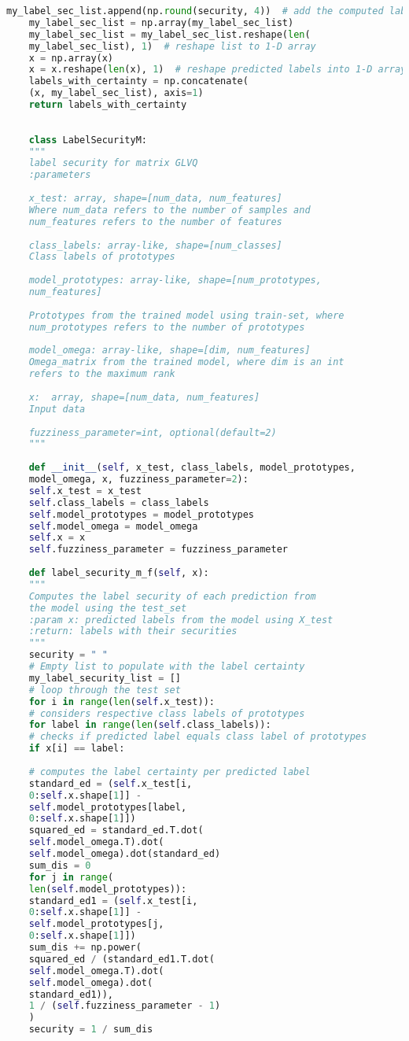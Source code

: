 \begin{lstlisting}[caption=label\textunderscore security1.py ,style=chstyle, language=Python]
	my_label_sec_list.append(np.round(security, 4))  # add the computed label certainty to list above
	my_label_sec_list = np.array(my_label_sec_list)
	my_label_sec_list = my_label_sec_list.reshape(len(
	my_label_sec_list), 1)  # reshape list to 1-D array
	x = np.array(x)
	x = x.reshape(len(x), 1)  # reshape predicted labels into 1-D array
	labels_with_certainty = np.concatenate(
	(x, my_label_sec_list), axis=1)
	return labels_with_certainty
	
	
	class LabelSecurityM:
	"""
	label security for matrix GLVQ
	:parameters
	
	x_test: array, shape=[num_data, num_features]
	Where num_data refers to the number of samples and
	num_features refers to the number of features
	
	class_labels: array-like, shape=[num_classes]
	Class labels of prototypes
	
	model_prototypes: array-like, shape=[num_prototypes,
	num_features]
	
	Prototypes from the trained model using train-set, where
	num_prototypes refers to the number of prototypes
	
	model_omega: array-like, shape=[dim, num_features]
	Omega_matrix from the trained model, where dim is an int
	refers to the maximum rank
	
	x:  array, shape=[num_data, num_features]
	Input data
	
	fuzziness_parameter=int, optional(default=2)
	"""
	
	def __init__(self, x_test, class_labels, model_prototypes,
	model_omega, x, fuzziness_parameter=2):
	self.x_test = x_test
	self.class_labels = class_labels
	self.model_prototypes = model_prototypes
	self.model_omega = model_omega
	self.x = x
	self.fuzziness_parameter = fuzziness_parameter
	
	def label_security_m_f(self, x):
	"""
	Computes the label security of each prediction from 
	the model using the test_set
	:param x: predicted labels from the model using X_test
	:return: labels with their securities
	"""
	security = " "
	# Empty list to populate with the label certainty
	my_label_security_list = []
	# loop through the test set
	for i in range(len(self.x_test)):
	# considers respective class labels of prototypes
	for label in range(len(self.class_labels)):
	# checks if predicted label equals class label of prototypes
	if x[i] == label:
	
	# computes the label certainty per predicted label
	standard_ed = (self.x_test[i,
	0:self.x.shape[1]] - 
	self.model_prototypes[label,
	0:self.x.shape[1]])
	squared_ed = standard_ed.T.dot(
	self.model_omega.T).dot(
	self.model_omega).dot(standard_ed)
	sum_dis = 0
	for j in range(
	len(self.model_prototypes)):
	standard_ed1 = (self.x_test[i,
	0:self.x.shape[1]] -
	self.model_prototypes[j,
	0:self.x.shape[1]])
	sum_dis += np.power(
	squared_ed / (standard_ed1.T.dot(
	self.model_omega.T).dot(
	self.model_omega).dot(
	standard_ed1)),
	1 / (self.fuzziness_parameter - 1)
	)
	security = 1 / sum_dis
	

\end{lstlisting}
